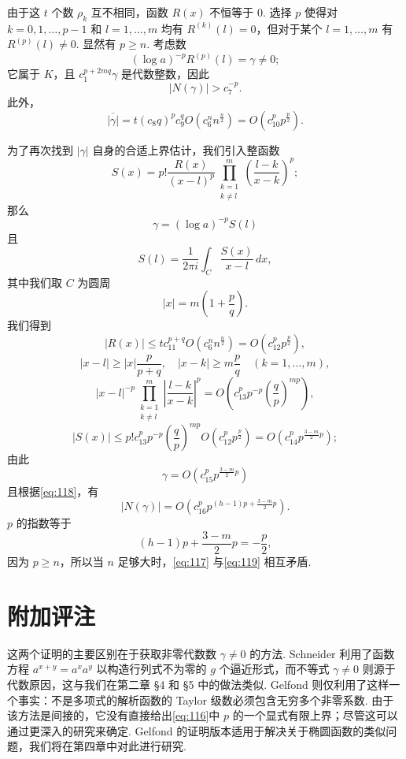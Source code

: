 由于这 $t$ 个数 $\rho_k$ 互不相同，函数 $R(x)$ 不恒等于 0. 选择 $p$ 使得对 $k = 0, 1, \dots, p-1$ 和 $l = 1, \dots, m$ 均有 $R^{(k)}(l) = 0$，但对于某个 $l = 1, \dots, m$ 有 $R^{(p)}(l) \neq 0$. 显然有 $p \ge n$. 考虑数
\begin{equation}
(\log a)^{-p} R^{(p)}(l) = \gamma \neq 0; \tag{116}\label{eq:116}
\end{equation}
它属于 $K$，且 $c_1^{p+2mq} \gamma$ 是代数整数，因此
\begin{equation}
|N(\gamma)| > c_7^{-p}. \tag{117}\label{eq:117}
\end{equation}
此外，
\begin{equation}
\overline{|\gamma|} = t (c_8 q)^p c_9^q O(c_6^n n^{\frac{n}{2}}) = O(c_{10}^p p^{\frac{p}{2}}). \tag{118}\label{eq:118}
\end{equation}

为了再次找到 $|\gamma|$ 自身的合适上界估计，我们引入整函数
\[
S(x) = p! \frac{R(x)}{(x-l)^p} \prod_{\substack{k=1\\k\neq l}}^m \left(\frac{l-k}{x-k}\right)^p;
\]
那么
\[
\gamma = (\log a)^{-p} S(l)
\]
且
\[
S(l) = \frac{1}{2\pi i} \int_{C} \frac{S(x)}{x-l} \, dx,
\]
其中我们取 $C$ 为圆周
\[
|x| = m\left(1 + \frac{p}{q}\right).
\]
我们得到
\[
|R(x)| \le t c_{11}^{p+q} O(c_6^n n^{\frac{n}{2}}) = O(c_{12}^p p^{\frac{p}{2}}),
\]
\[
|x-l| \ge |x| \frac{p}{p+q}, \quad |x-k| \ge m \frac{p}{q} \quad (k=1,\dots,m),
\]
\[
|x-l|^{-p} \prod_{\substack{k=1 \\ k\neq l}}^{m} \left|\frac{l-k}{x-k}\right|^{p} = O\left(c_{13}^p p^{-p} \left(\frac{q}{p}\right)^{mp}\right),
\]
\[
|S(x)| \le p! c_{13}^p p^{-p} \left(\frac{q}{p}\right)^{mp} O\left(c_{12}^p p^{\frac{p}{2}}\right) = O\left(c_{14}^p p^{\frac{3-m}{2}p}\right);
\]
由此
\[
\gamma = O\left(c_{15}^p p^{\frac{3-m}{2}p}\right)
\]
且根据\eqref{eq:118}，有
\begin{equation}
|N(\gamma)| = O\left(c_{16}^p p^{(h-1)p + \frac{3-m}{2}p}\right). \tag{119}\label{eq:119}
\end{equation}
$p$ 的指数等于
\[
(h-1)p + \frac{3-m}{2}p = -\frac{p}{2},
\]
因为 $p \ge n$，所以当 $n$ 足够大时，\eqref{eq:117} 与\eqref{eq:119} 相互矛盾.

\section{附加评注}\label{sec:3}

这两个证明的主要区别在于获取非零代数数 $\gamma \neq 0$ 的方法. Schneider 利用了函数方程 $a^{x+y} = a^x a^y$ 以构造行列式不为零的 $g$ 个逼近形式，而不等式 $\gamma \neq 0$ 则源于代数原因，这与我们在第二章 \S 4 和 \S 5 中的做法类似. Gelfond 则仅利用了这样一个事实：不是多项式的解析函数的 Taylor 级数必须包含无穷多个非零系数. 由于该方法是间接的，它没有直接给出\eqref{eq:116}中 $p$ 的一个显式有限上界；尽管这可以通过更深入的研究来确定. Gelfond 的证明版本适用于解决关于椭圆函数的类似问题，我们将在第四章中对此进行研究.

